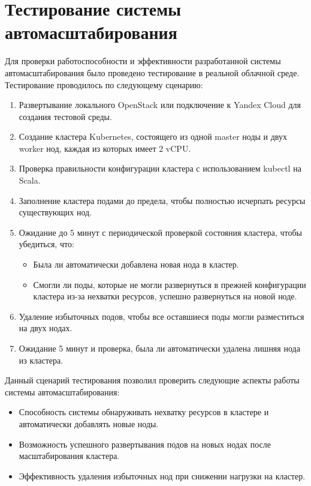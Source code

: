 \section{Тестирование системы автомасштабирования}

Для проверки работоспособности и эффективности разработанной системы
автомасштабирования было проведено тестирование в
реальной облачной среде. Тестирование проводилось по следующему сценарию:

\begin{enumerate}
  \item Развертывание локального OpenStack или подключение к Yandex Cloud для
создания тестовой среды.
  \item Создание кластера Kubernetes, состоящего из одной master ноды и двух
worker нод, каждая из которых имеет 2 vCPU.
  \item Проверка правильности конфигурации кластера с использованием kubectl на
Scala.
  \item Заполнение кластера подами до предела, чтобы полностью исчерпать ресурсы
существующих нод.
  \item Ожидание до 5 минут с периодической проверкой состояния кластера, чтобы
убедиться, что:
    \begin{itemize}
      \item Была ли автоматически добавлена новая нода в кластер.
      \item Смогли ли поды, которые не могли развернуться в прежней конфигурации
кластера из-за нехватки ресурсов, успешно развернуться на новой ноде.
    \end{itemize}
  \item Удаление избыточных подов, чтобы все оставшиеся поды могли разместиться
на двух нодах.
  \item Ожидание 5 минут и проверка, была ли автоматически удалена лишняя нода
из кластера.
\end{enumerate}

Данный сценарий тестирования позволил проверить следующие аспекты работы системы
автомасштабирования:

\begin{itemize}
  \item Способность системы обнаруживать нехватку ресурсов в кластере и
автоматически добавлять новые ноды.
  \item Возможность успешного развертывания подов на новых нодах после
масштабирования кластера.
  \item Эффективность удаления избыточных нод при снижении нагрузки на кластер.
\end{itemize}

